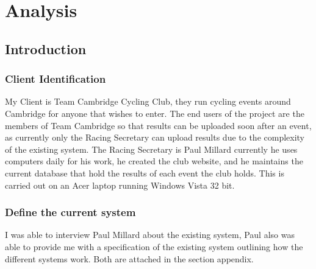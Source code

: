 \chapter{Analysis}

\section{Introduction}

\subsection{Client Identification}
My Client is Team Cambridge Cycling Club, they run cycling events around Cambridge for anyone that wishes to enter. The end users of the project are the members of Team Cambridge so that results can be uploaded soon after an event, as currently only the Racing Secretary can upload results due to the complexity of the existing system. The Racing Secretary is Paul Millard currently he uses computers daily for his work, he created the club website, and he maintains the current database that hold the results of each event the club holds. This is carried out on an Acer laptop running Windows Vista 32 bit.

\subsection{Define the current system}
I was able to interview Paul Millard about the existing system, Paul also was able to provide me with a specification of the existing system outlining how the different systems work. Both are attached in the section appendix.

